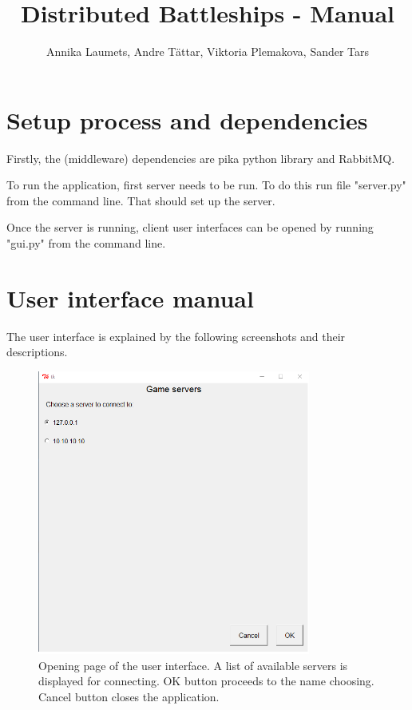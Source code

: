 \documentclass[]{article}
\title{Distributed Battleships - Manual}
\author{Annika Laumets, Andre Tättar, Viktoria Plemakova, Sander Tars}
\begin{document}
\lstset{language=Python}  

\maketitle

\section*{Setup process and dependencies}
Firstly, the (middleware) dependencies are pika python library and RabbitMQ.

To run the application, first server needs to be run. To do this run file "server.py" from the command line. That should set up the server.

Once the server is running, client user interfaces can be opened by running "gui.py" from the command line.
\newpage

\section*{User interface manual}
The user interface is explained by the following screenshots and their descriptions.


\begin{figure}[!hbt]
	\centering
	\includegraphics[width=0.8\textwidth]{OpenPage.png}
	\caption{Opening page of the user interface. A list of available servers is displayed for connecting. OK button proceeds to the name choosing. Cancel button closes the application.}
	\label{fig:Openpage}
\end{figure}
\end{document}
